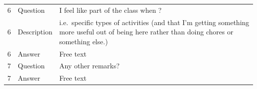 \documentclass[paper=a4,justified,a4paper]{tufte-handout}
\begin{document}
\begin{longtable}[]{@{}lll@{}}
\begin{minipage}[t]{0.30\columnwidth}\raggedright
6\strut
\end{minipage} & \begin{minipage}[t]{0.30\columnwidth}\raggedright
Question\strut
\end{minipage} & \begin{minipage}[t]{0.30\columnwidth}\raggedright
I feel like part of the class when ?\strut
\end{minipage}\tabularnewline
\begin{minipage}[t]{0.30\columnwidth}\raggedright
6\strut
\end{minipage} & \begin{minipage}[t]{0.30\columnwidth}\raggedright
Description\strut
\end{minipage} & \begin{minipage}[t]{0.30\columnwidth}\raggedright
i.e.~specific types of activities (and that I'm getting something more
useful out of being here rather than doing chores or something
else.)\strut
\end{minipage}\tabularnewline
\begin{minipage}[t]{0.30\columnwidth}\raggedright
6\strut
\end{minipage} & \begin{minipage}[t]{0.30\columnwidth}\raggedright
Answer\strut
\end{minipage} & \begin{minipage}[t]{0.30\columnwidth}\raggedright
Free text\strut
\end{minipage}\tabularnewline
\begin{minipage}[t]{0.30\columnwidth}\raggedright
7\strut
\end{minipage} & \begin{minipage}[t]{0.30\columnwidth}\raggedright
Question\strut
\end{minipage} & \begin{minipage}[t]{0.30\columnwidth}\raggedright
Any other remarks?\strut
\end{minipage}\tabularnewline
\begin{minipage}[t]{0.30\columnwidth}\raggedright
7\strut
\end{minipage} & \begin{minipage}[t]{0.30\columnwidth}\raggedright
Answer\strut
\end{minipage} & \begin{minipage}[t]{0.30\columnwidth}\raggedright
Free text\strut
\end{minipage}\tabularnewline

\end{longtable}
\end{document}
